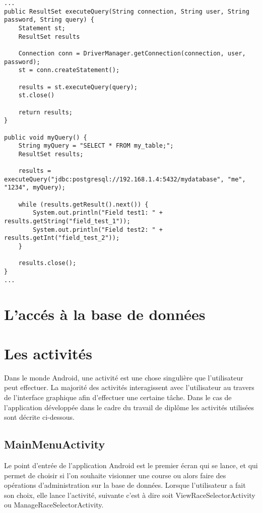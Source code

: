 \begin{lstlisting}[style=JavaStyle]
...
public ResultSet executeQuery(String connection, String user, String password, String query) {
	Statement st;
	ResultSet results

	Connection conn = DriverManager.getConnection(connection, user, password);
	st = conn.createStatement();
	
	results = st.executeQuery(query);
	st.close()	
	
	return results;
}

public void myQuery() {
	String myQuery = "SELECT * FROM my_table;";
	ResultSet results;
	
	results = executeQuery("jdbc:postgresql://192.168.1.4:5432/mydatabase", "me", "1234", myQuery);
	
	while (results.getResult().next()) {
		System.out.println("Field test1: " + results.getString("field_test_1"));
		System.out.println("Field test2: " + results.getInt("field_test_2"));
	}
	
	results.close();	
}
...
\end{lstlisting}

\section{L'accés à la base de données}


\section{Les activités}

Dans le monde Android, une activité est une chose singulière que l'utilisateur peut effectuer. La majorité des activités interagissent avec l'utilisateur au travers de l'interface graphique afin d'effectuer une certaine tâche.  Dans le cas de l'application développée dans le cadre du travail de diplôme les activités utilisées sont décrite ci-dessous.

\subsection{MainMenuActivity}

Le point d'entrée de l'application Android est le premier écran qui se lance, et qui permet de choisir si l'on souhaite visionner une course ou alors faire des opérations d'administration sur la base de données. Lorsque l'utilisateur a fait son choix, elle lance l'activité, suivante c'est à dire soit ViewRaceSelectorActivity ou ManageRaceSelectorActivity.

